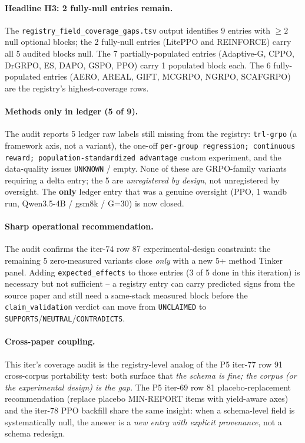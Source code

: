 \documentclass{article}
\begin{document}
\paragraph{Headline H3: 2 fully-null entries remain.}
The \texttt{registry\_field\_coverage\_gaps.tsv} output identifies
9 entries with $\geq 2$ null optional blocks; the 2 fully-null entries
(LitePPO and REINFORCE) carry all 5 audited blocks null. The 7
partially-populated entries (Adaptive-G, CPPO, DrGRPO, ES, DAPO,
GSPO, PPO) carry 1 populated block each. The 6 fully-populated
entries (AERO, AREAL, GIFT, MCGRPO, NGRPO, SCAFGRPO) are the
registry's highest-coverage rows.

\paragraph{Methods only in ledger (5 of 9).}
The audit reports 5 ledger raw labels still missing from the registry:
\texttt{trl-grpo} (a framework axis, not a variant), the one-off
\texttt{per-group regression; continuous reward;
population-standardized advantage} custom experiment, and the
data-quality issues \texttt{UNKNOWN} / empty. None of these are
GRPO-family variants requiring a delta entry; the 5 are
\emph{unregistered by design}, not unregistered by oversight. The
\textbf{only} ledger entry that was a genuine oversight (PPO, 1
wandb run, Qwen3.5-4B / gsm8k / G=30) is now closed.

\paragraph{Sharp operational recommendation.}
The audit confirms the iter-74 row 87 experimental-design
constraint: the remaining 5 zero-measured variants close \emph{only}
with a new 5+ method Tinker panel. Adding \texttt{expected\_effects}
to those entries (3 of 5 done in this iteration) is necessary but not
sufficient -- a registry entry can carry predicted signs from the
source paper and still need a same-stack measured block before the
\texttt{claim\_validation} verdict can move from \texttt{UNCLAIMED}
to \texttt{SUPPORTS}/\texttt{NEUTRAL}/\texttt{CONTRADICTS}.

\paragraph{Cross-paper coupling.}
This iter's coverage audit is the registry-level analog of the
P5 iter-77 row 91 cross-corpus portability test: both surface that
\emph{the schema is fine; the corpus (or the experimental design)
is the gap}. The P5 iter-69 row 81 placebo-replacement
recommendation (replace placebo MIN-REPORT items with yield-aware
axes) and the iter-78 PPO backfill share the same insight: when a
schema-level field is systematically null, the answer is a
\emph{new entry with explicit provenance}, not a schema redesign.
\end{document}
